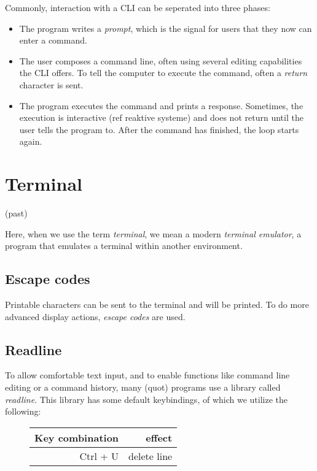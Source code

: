 \documentclass[twoside]{scrreprt}
\begin{document}
Commonly, interaction with a \textsc{CLI} can be seperated into three phases:

\begin{itemize}
    \item The program writes a \emph{prompt}, which is the signal for users that they now can enter a command.
    \item The user composes a command line, often using several editing capabilities the CLI offers. To tell the computer to execute the command, often a \emph{return} character is sent.
    \item The program executes the command and prints a response. Sometimes, the execution is interactive (ref reaktive systeme) and does not return until the user tells the program to. After the command has finished, the loop starts again.
\end{itemize}

\section{Terminal}

(past)

Here, when we use the term \emph{terminal}, we mean a modern \emph{terminal emulator}, a program that emulates a terminal within another environment.

\subsection{Escape codes}

Printable characters can be sent to the terminal and will be printed. To do more advanced display actions, \emph{escape codes} are used.

\subsection{Readline}

To allow comfortable text input, and to enable functions like command line editing or a command history, many (quot) programs use a library called \emph{readline}. This library has some default keybindings, of which we utilize the following:

\begin{figure}
    \begin{tabular}{r|r}
        Key combination & effect \\
        \hline
        Ctrl + U & delete line \\
    \end{tabular}
\end{figure}
\end{document}
